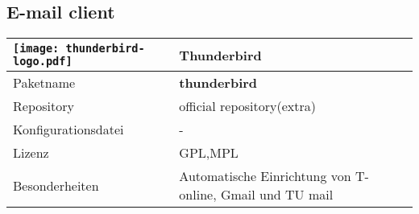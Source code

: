 \subsection{E-mail client}
\begin{tabular}{l|l}
\texttt{[image: thunderbird-logo.pdf]} & Thunderbird \\ \hline
Paketname & \textbf{thunderbird} \\ 
Repository & official repository(extra) \\
Konfigurationsdatei & - \\
Lizenz & GPL,MPL \\
Besonderheiten & Automatische Einrichtung von T-online, Gmail und TU mail \\
\end{tabular}

